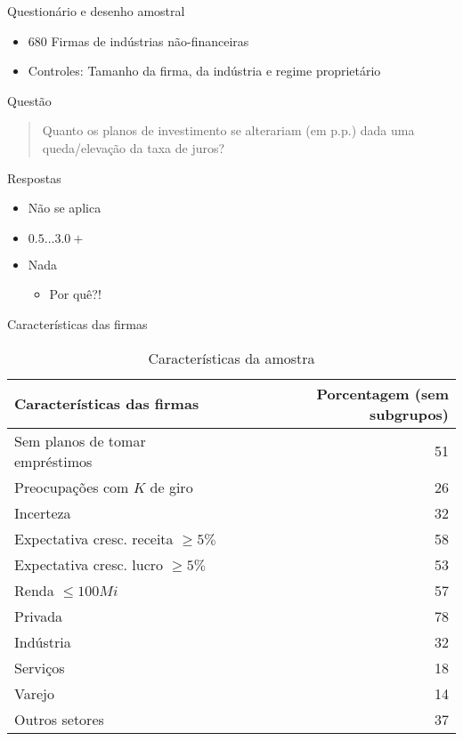 \documentclass[presentation]{beamer}
\begin{document}
\begin{frame}[label={sec:org4fd368d}]{Questionário e desenho amostral}
\begin{itemize}
\item 680 Firmas de indústrias não-financeiras
\item \alert{Controles:} Tamanho da firma, da indústria e regime proprietário
\end{itemize}


\begin{block}{Questão}
\begin{quote}
Quanto os planos de investimento se alterariam (em p.p.) dada uma queda/elevação da taxa de juros?
\end{quote}
\end{block}

\begin{block}{Respostas}
\begin{itemize}
\item Não se aplica
\item \(0.5 \ldots 3.0+\)
\item Nada
\begin{itemize}
\item Por quê?!
\end{itemize}
\end{itemize}
\end{block}
\end{frame}

\begin{frame}[label={sec:orgd079670}]{Características das firmas}
\begin{table}[htbp]
\caption{Características da amostra}
\centering
\begin{tabular}{lr}
\hline
Características das firmas & Porcentagem (sem subgrupos)\\
\hline
Sem planos de tomar empréstimos & 51\\
Preocupações com \(K\) de giro & 26\\
\hline
Incerteza & 32\\
Expectativa cresc. receita \(\geq 5\%\) & 58\\
Expectativa cresc. lucro \(\geq 5\%\) & 53\\
Renda \(\leq 100 Mi\) & 57\\
Privada & 78\\
\hline
Indústria & 32\\
Serviços & 18\\
Varejo & 14\\
Outros setores & 37\\
\hline
\end{tabular}
\end{table}
\end{frame}
\end{document}
